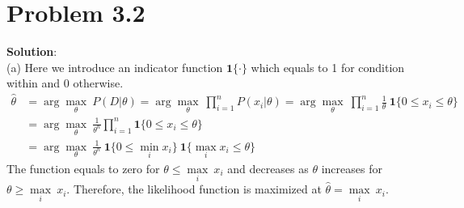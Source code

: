 \documentclass[12pt]{article}
\begin{document}
\section{Problem 3.2}
\large{\textbf{Solution}}: \\
(a) Here we introduce an indicator function $\bm{1}\{\cdot\}$ which equals to 1 for condition within and 0 otherwise. 
\begin{equation*}
\begin{aligned}
\hat{\theta} &=\arg\max_{\theta}\ P(D|\theta) = \arg\max_{\theta}\ \prod_{i=1}^{n} P(x_i|\theta) =\arg\max_{\theta}\ \prod_{i=1}^{n} \frac{1}{\theta}\ \bm{1}\{0\leq x_i\leq \theta\}\\ 
&=\arg\max_{\theta}\  \frac{1}{\theta^n} \prod_{i=1}^{n}\bm{1}\{0\leq x_i\leq \theta\}\\ 
&= \arg\max_{\theta}\  \frac{1}{\theta^n}\ \bm{1}\{0\leq\min_i x_i\}\ \bm{1}\{\max_i x_i\leq\theta\}
\end{aligned}
\end{equation*}
The function equals to zero for $\theta\leq \underset{i}{\max}\ x_i$ and decreases as $\theta$ increases for $\theta\geq \underset{i}{\max}\ x_i$.  Therefore, the likelihood function is maximized at $\hat{\theta} =  \underset{i}{\max}\ x_i$.
\end{document}
